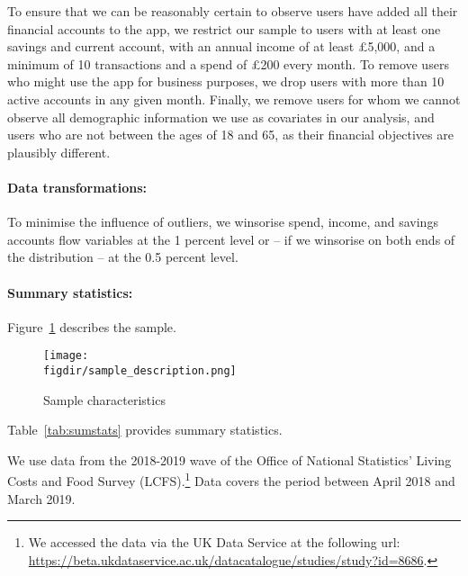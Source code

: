 To ensure that we can be reasonably certain to observe users have added all
their financial accounts to the app, we restrict our sample to users with at
least one savings and current account, with an annual income of at least
\pounds5,000, and a minimum of 10 transactions and a spend of \pounds200 every
month. To remove users who might use the app for business purposes, we drop
users with more than 10 active accounts in any given month. Finally, we remove
users for whom we cannot observe all demographic information we use as
covariates in our analysis, and users who are not between the ages of 18 and
65, as their financial objectives are plausibly different.


\paragraph{Data transformations:}%
\label{par:data_transformations}

To minimise the influence of outliers, we winsorise spend, income, and savings
accounts flow variables at the 1 percent level or -- if we winsorise on both
ends of the distribution -- at the 0.5 percent level.


\paragraph{Summary statistics:}%
\label{par:summary_statistics}

Figure~\ref{fig:sample_description} describes the sample.

\begin{figure}[H]
    \centering
    \caption{Sample characteristics}
    \texttt{[image: \\figdir/sample\_description.png]}
    \label{fig:sample_description}
\end{figure}

Table~\ref{tab:sumstats} provides summary statistics.



We use data from the 2018-2019 wave of the Office of National Statistics' Living Costs and Food
Survey (LCFS).\footnote{We accessed the data via the UK Data Service at the
following url:
\url{https://beta.ukdataservice.ac.uk/datacatalogue/studies/study?id=8686}.}
Data covers the period between April 2018 and March 2019.


